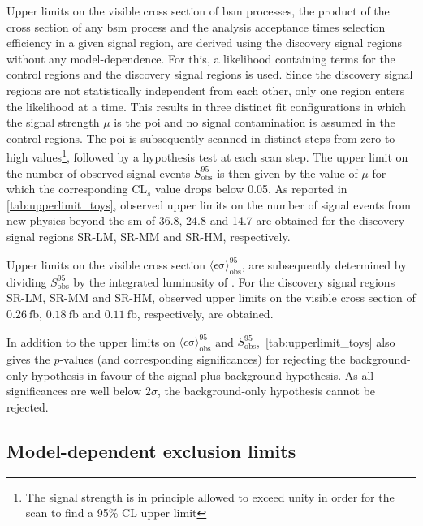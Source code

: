 Upper limits on the visible cross section of \gls{bsm} processes, \ie the product of the cross section of any \gls{bsm} process and the analysis acceptance times selection efficiency in a given signal region, are derived using the discovery signal regions without any model-dependence.
For this, a likelihood containing terms for the control regions and the discovery signal regions is used.
Since the discovery signal regions are not statistically independent from each other, only one region enters the likelihood at a time.
This results in three distinct fit configurations in which the signal strength $\mu$ is the \gls{poi} and no signal contamination is assumed in the control regions.
The \gls{poi} is subsequently scanned in distinct steps from zero to high values\footnote{The signal strength is in principle allowed to exceed unity in order for the scan to find a 95\% CL upper limit}, followed by a hypothesis test at each scan step.
The upper limit on the number of observed signal events $S_{\mathrm{ obs}}^{95}$ is then given by the value of $\mu$ for which the corresponding CL$_s$ value drops below 0.05.
As reported in \cref{tab:upperlimit_toys}, observed upper limits on the number of signal events from new physics beyond the \gls{sm} of 36.8, 24.8 and 14.7 are obtained for the discovery signal regions SR-LM, SR-MM and SR-HM, respectively.

Upper limits on the visible cross section $\langle\epsilon{\mathrm{ \sigma}}\rangle_{\mathrm{ obs}}^{95}$, are subsequently determined by dividing $S_{\mathrm{ obs}}^{95}$ by the integrated luminosity of \onethirtynineifb. For the discovery signal regions SR-LM, SR-MM and SR-HM, observed upper limits on the visible cross section of $\SI{0.26}{\femto\barn}$, $\SI{0.18}{\femto\barn}$ and $\SI{0.11}{\femto\barn}$, respectively, are obtained.

In addition to the upper limits on $\langle\epsilon{\mathrm{ \sigma}}\rangle_{\mathrm{ obs}}^{95}$ and $S_{\mathrm{ obs}}^{95}$,~\cref{tab:upperlimit_toys} also gives the $p$-values (and corresponding significances) for rejecting the background-only hypothesis in favour of the signal-plus-background hypothesis.
As all significances are well below $2\sigma$, the background-only hypothesis cannot be rejected.


\subsection{Model-dependent exclusion limits}\label{sec:model_independent_limits}

